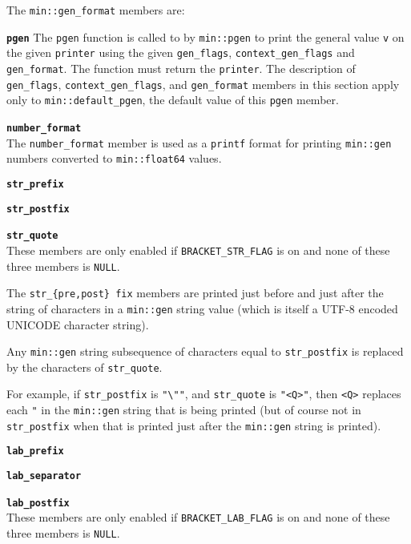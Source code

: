 \documentclass[12pt]{article}
\makeatletter
\newcommand{\TT}[1]{{\tt \bfseries #1}}
\newcommand{\ttmkey}[2]{\TT{#1}\index{#1@{\tt #1}!#2}}
\newcommand{\EOL}{\penalty \exhyphenpenalty}
\newenvironment{itemlist}[1][1.2in]%
	{\begin{list}{}{\setlength{\labelwidth}{#1}%
		        \setlength{\leftmargin}{\labelwidth}%
		        \addtolength{\leftmargin}{+0.2in}%
		        \renewcommand{\makelabel}[1]{##1\hfill}}}%
	{\end{list}}
\makeatother
\begin{document}
The {\tt min::gen\_format} members are:

\begin{itemlist}[0.4in]

\item[\ttmkey{pgen}{in {\tt min::gen\_format}}]
The {\tt pgen} function is called to by {\tt min::pgen} to print
the general value {\tt v} on the given {\tt printer} using
the given {\tt gen\_\EOL flags}, {\tt context\_\EOL gen\_\EOL flags}
and {\tt gen\_\EOL format}.
The function must return the {\tt printer}.  The description of
{\tt gen\_\EOL flags}, {\tt context\_\EOL gen\_\EOL flags},
and {\tt gen\_\EOL format} members in
this section apply only to {\tt min::\EOL default\_\EOL pgen},
the default value of this {\tt pgen} member.

\item[\ttmkey{number\_format}{in {\tt min::gen\_format}}]~\\
The {\tt number\_format} member is used as a {\tt printf} format
for printing {\tt min::gen} numbers converted to {\tt min::\EOL float64} values.

\item[\ttmkey{str\_prefix}{in {\tt min::gen\_format}}]
\item[\ttmkey{str\_postfix}{in {\tt min::gen\_format}}]\vspace{-2ex}
\item[\ttmkey{str\_quote}{in {\tt min::gen\_format}}]\vspace{-2ex}~\\
These members are only enabled if {\tt BRACKET\_\EOL STR\_\EOL FLAG} is on
and none of these three members is {\tt NULL}.

The {\tt str\_\EOL \{pre,post\} fix} members are printed just before and
just after the string of characters in a {\tt min::gen} string value
(which is itself a UTF-8 encoded UNICODE character string).

Any {\tt min::gen} string
subsequence of characters equal to {\tt str\_\EOL post\-fix} is replaced
by the characters of {\tt str\_\EOL quote}.

For example, if
{\tt str\_\EOL postfix} is \verb|"\""|, and
{\tt str\_\EOL quote} is \verb|"<Q>"|, then \verb|<Q>| replaces
each \verb|"| in the {\tt min::gen} string that is being printed
(but of course not in {\tt str\_\EOL postfix}
when that is printed just after the {\tt min::gen} string is printed).

\item[\ttmkey{lab\_prefix}{in {\tt min::gen\_format}}]
\item[\ttmkey{lab\_separator}{in {\tt min::gen\_format}}]\vspace{-2ex}
\item[\ttmkey{lab\_postfix}{in {\tt min::gen\_format}}]\vspace{-2ex}~\\
These members are only enabled if {\tt BRACKET\_\EOL LAB\_\EOL FLAG} is on
and none of these three members is {\tt NULL}.


\end{itemlist}
\end{document}
